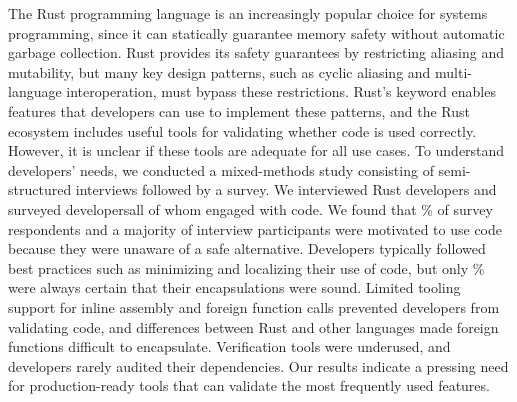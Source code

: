 The Rust programming language is an increasingly popular choice for systems programming, since it can statically guarantee memory safety without automatic garbage collection. Rust provides its safety guarantees by restricting aliasing and mutability, but many key design patterns, such as cyclic aliasing and multi-language interoperation, must bypass these restrictions. Rust's \unsafe keyword enables features that developers can use to implement these patterns, and the Rust ecosystem includes useful tools for validating whether \unsafe code is used correctly. However, it is unclear if these tools are adequate for all use cases. To understand developers' needs, we conducted a mixed-methods study consisting of semi-structured interviews followed by a survey. We interviewed  Rust developers and surveyed  developers\textemdash all of whom engaged with \unsafe code. We found that \% of survey respondents and a majority of interview participants were motivated to use \unsafe code because they were unaware of a safe alternative. Developers typically followed best practices such as minimizing and localizing their use of \unsafe code, but only \someuncertain\% were always certain that their encapsulations were sound. Limited tooling support for inline assembly and foreign function calls prevented developers from validating \unsafe code, and differences between Rust and other languages made foreign functions difficult to encapsulate. Verification tools were underused, and developers rarely audited their dependencies. Our results indicate a pressing need for production-ready tools that can validate the most frequently used \unsafe features.